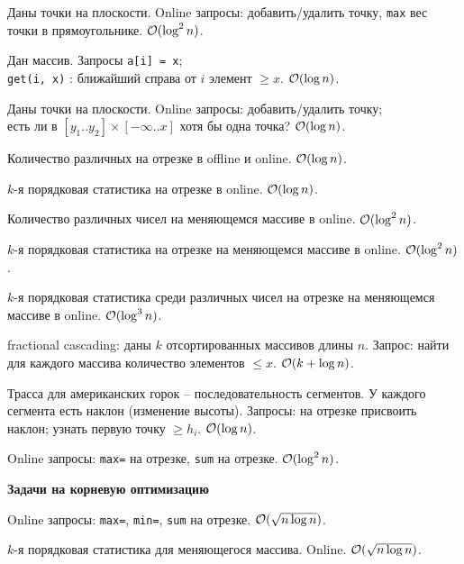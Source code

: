 \documentclass[12pt,a4paper,oneside]{article}
\renewcommand{\t}{\texttt}
\renewcommand{\le}{\leqslant}
\renewcommand{\ge}{\geqslant}
\begin{document}
\begin{MyList}
  \setcounter{enumi}{-1}
  \item Даны точки на плоскости. Online запросы: добавить/удалить точку, \t{max} вес точки в прямоугольнике. $\mathcal{O}(\log^2 n)$.
  \item Дан массив. Запросы \t{a[i] = x}; \\
    \t{get(i, x)} : ближайший справа от $i$ элемент $\ge x$. $\mathcal{O}(\log n)$.
  \item Даны точки на плоскости. Online запросы: добавить/удалить точку; \\
    есть ли в $[y_1..y_2] \times [{-}\infty..x]$ хотя бы одна точка? $\mathcal{O}(\log n)$.
  \item Количество различных на отрезке в offline и online. $\mathcal{O}(\log n)$.
  \item $k$-я порядковая статистика на отрезке в online. $\mathcal{O}(\log n)$.
  \item Количество различных чисел на меняющемся массиве в online. $\mathcal{O}(\log^2 n)$.
  \item $k$-я порядковая статистика на отрезке на меняющемся массиве в online. $\mathcal{O}(\log^2 n)$.
  \item $k$-я порядковая статистика среди различных чисел на отрезке на меняющемся массиве в online. $\mathcal{O}(\log^3 n)$.
  \item fractional cascading: даны $k$ отсортированных массивов длины $n$. Запрос: найти для каждого массива количество элементов $\le x$. $\mathcal{O}(k + \log n)$.
  \item Трасса для американских горок -- последовательность сегментов. У каждого сегмента есть наклон (изменение высоты).
    Запросы: на отрезке присвоить наклон; узнать первую точку $\ge h_i$. $\mathcal{O}(\log n)$.
  \item Online запросы: \t{max=} на отрезке, \t{sum} на отрезке. $\mathcal{O}(\log^2 n)$.
\end{MyList}

{\bf Задачи на корневую оптимизацию}

\begin{MyList}
  \setcounter{enumi}{10}
  \item Online запросы: \t{max=}, \t{min=}, \t{sum} на отрезке. $\mathcal{O}(\sqrt{n \log n})$.
  \item $k$-я порядковая статистика для меняющегося массива. Online. $\mathcal{O}(\sqrt{n \log n})$.
\end{MyList}
\end{document}
